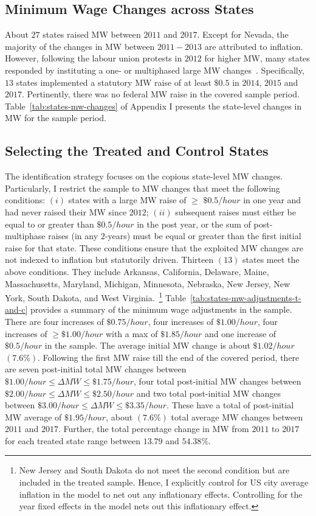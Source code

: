 \documentclass[12pt, english]{article}
\begin{document}
    \subsection{Minimum Wage Changes across States}\label{subsec:minimum-wage-changes-across-states}
    About $27$ states raised MW between $2011$ and $2017$. Except for Nevada, the majority of the changes in MW between $2011-2013$ are attributed to inflation. However, following the labour union protests in $2012$ for higher MW, many states responded by instituting a one- or multiphased large MW changes~\parencite{lathrop2021raises}. Specifically, $13$ states implemented a statutory MW raise of at least $\$0.5$ in $2014$, $2015$ and $2017$. Pertinently, there was no federal MW raise in the covered sample period. Table~\ref{tab:states-mw-changes} of Appendix I presents the state-level changes in MW for the sample period.

    \subsection{Selecting the Treated and Control States}\label{subsec:selecting-the-treated-and-control-states}
    The identification strategy focuses on the copious state-level MW changes. Particularly, I restrict the sample to MW changes that meet the following conditions: $(i)$ states with a large MW raise of $\geq$ $\$0.5/hour$ in one year and had never raised their MW since $2012$; $(ii)$ subsequent raises must either be equal to or greater than $\$0.5/hour$ in the post year, or the sum of post-multiphase raises (in any $2$-years) must be equal or greater than the first initial raise for that state. These conditions ensure that the exploited MW changes are not indexed to inflation but statutorily driven. Thirteen $(13)$ states meet the above conditions. They include Arkansas, California, Delaware, Maine, Massachusetts, Maryland, Michigan, Minnesota, Nebraska, New Jersey, New York, South Dakota, and West Virginia.~\footnote{\tiny New Jersey and South Dakota do not meet the second condition but are included in the treated sample. Hence, I explicitly control for US city average inflation in the model to net out any inflationary effects. Controlling for the year fixed effects in the model nets out this inflationary effect.} Table~\ref{tab:states-mw-adjustments-t-and-c} provides a summary of the minimum wage adjustments in the sample. There are four increases of $\$0.75/hour$, four increases of $\$1.00/hour$, four increases of $\geq \$1.00/hour$ with a max of $\$1.85/hour$ and one increase of $\$0.5/hour$ in the sample. The average initial MW change is about $\$1.02/hour$ $(7.6\%)$. Following the first MW raise till the end of the covered period, there are seven post-initial total MW changes between $\$1.00/hour \leq \Delta MW \leq \$1.75/hour$, four total post-initial MW changes between $\$2.00/hour \leq \Delta MW \leq \$2.50/hour$ and two total post-initial MW changes between $\$3.00/hour \leq \Delta MW \leq \$3.35/hour$. These have a total of post-initial MW average of $\$1.95/hour$, about $(7.6\%)$ total average MW changes between $2011$ and $2017$. Further, the total percentage change in MW from $2011$ to $2017$ for each treated state range between $13.79$ and $54.38\%$.
    
\end{document}
